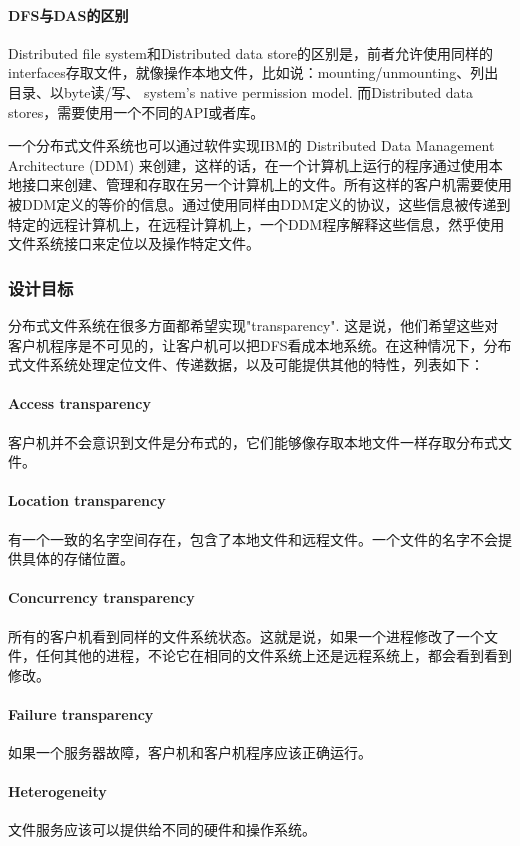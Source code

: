 \documentclass[UTF8]{ctexart}
\begin{document}
\paragraph{DFS与DAS的区别}Distributed file system和Distributed data store的区别是，前者允许使用同样的interfaces存取文件，就像操作本地文件，比如说：mounting/unmounting、列出目录、以byte读/写、 system's native permission model. 而Distributed data stores，需要使用一个不同的API或者库。

一个分布式文件系统也可以通过软件实现IBM的 Distributed Data Management Architecture (DDM) 来创建，这样的话，在一个计算机上运行的程序通过使用本地接口来创建、管理和存取在另一个计算机上的文件。所有这样的客户机需要使用被DDM定义的等价的信息。通过使用同样由DDM定义的协议，这些信息被传递到特定的远程计算机上，在远程计算机上，一个DDM程序解释这些信息，然乎使用文件系统接口来定位以及操作特定文件。

\subsubsection{设计目标}
分布式文件系统在很多方面都希望实现"transparency". 这是说，他们希望这些对客户机程序是不可见的，让客户机可以把DFS看成本地系统。在这种情况下，分布式文件系统处理定位文件、传递数据，以及可能提供其他的特性，列表如下：
\paragraph{Access transparency}
客户机并不会意识到文件是分布式的，它们能够像存取本地文件一样存取分布式文件。
\paragraph{Location transparency}
有一个一致的名字空间存在，包含了本地文件和远程文件。一个文件的名字不会提供具体的存储位置。
\paragraph{Concurrency transparency}
所有的客户机看到同样的文件系统状态。这就是说，如果一个进程修改了一个文件，任何其他的进程，不论它在相同的文件系统上还是远程系统上，都会看到看到修改。
\paragraph{Failure transparency}
如果一个服务器故障，客户机和客户机程序应该正确运行。
\paragraph{Heterogeneity}
文件服务应该可以提供给不同的硬件和操作系统。
\end{document}
